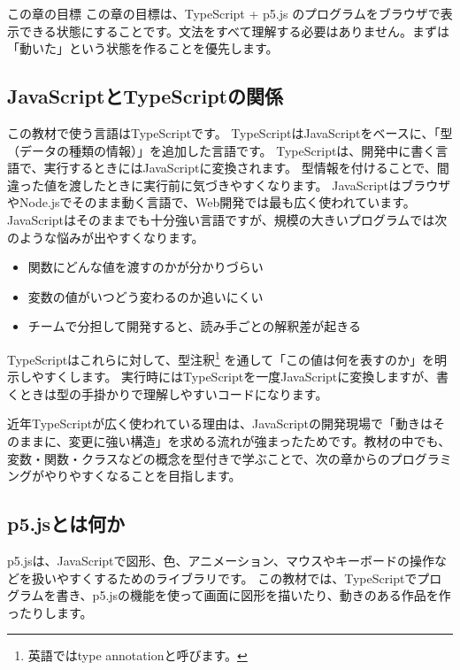\begin{pointbox}{この章の目標}
この章の目標は、TypeScript + p5.js のプログラムをブラウザで表示できる状態にすることです。文法をすべて理解する必要はありません。まずは「動いた」という状態を作ることを優先します。
\end{pointbox}

\subsection{JavaScriptとTypeScriptの関係}

この教材で使う言語はTypeScriptです。
TypeScriptはJavaScriptをベースに、「型（データの種類の情報）」を追加した言語です。
TypeScriptは、開発中に書く言語で、実行するときにはJavaScriptに変換されます。
型情報を付けることで、間違った値を渡したときに実行前に気づきやすくなります。
JavaScriptはブラウザやNode.jsでそのまま動く言語で、Web開発では最も広く使われています。
JavaScriptはそのままでも十分強い言語ですが、規模の大きいプログラムでは次のような悩みが出やすくなります。

\begin{itemize}
    \item 関数にどんな値を渡すのかが分かりづらい
    \item 変数の値がいつどう変わるのか追いにくい
    \item チームで分担して開発すると、読み手ごとの解釈差が起きる
\end{itemize}

TypeScriptはこれらに対して、型注釈\footnote{英語ではtype annotationと呼びます。}
を通して「この値は何を表すのか」を明示しやすくします。
実行時にはTypeScriptを一度JavaScriptに変換しますが、書くときは型の手掛かりで理解しやすいコードになります。

近年TypeScriptが広く使われている理由は、JavaScriptの開発現場で「動きはそのままに、変更に強い構造」を求める流れが強まったためです。教材の中でも、変数・関数・クラスなどの概念を型付きで学ぶことで、次の章からのプログラミングがやりやすくなることを目指します。

\subsection{p5.jsとは何か}

p5.jsは、JavaScriptで図形、色、アニメーション、マウスやキーボードの操作などを扱いやすくするためのライブラリです。
この教材では、TypeScriptでプログラムを書き、p5.jsの機能を使って画面に図形を描いたり、動きのある作品を作ったりします。

